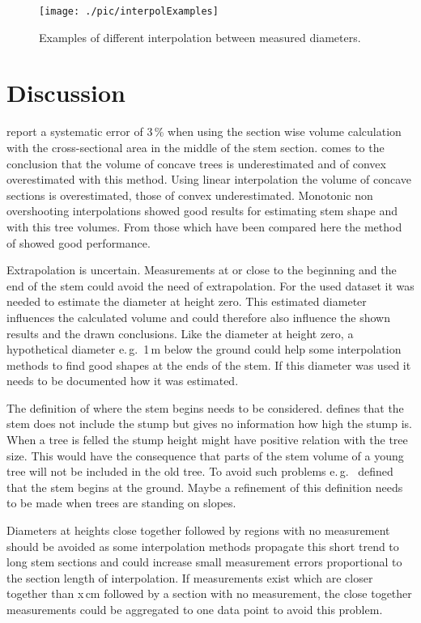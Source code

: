\documentclass[twocolumn]{scrartcl}
\begin{document}
\begin{figure}[htbp]
  \centering
  \texttt{[image: ./pic/interpolExamples]}
  \caption{Examples of different interpolation between measured diameters.}
  \label{fig:interpolExamples}
\end{figure}


\section{Discussion}

\cite{mueller1902holzmesskunde,müller1923holzmesskunde} report a systematic
error of 3\,\% when using the section wise volume calculation with the
cross-sectional area in the middle of the stem section.
\cite{prodan1965holzmesslehre} comes to the conclusion that the volume of
concave trees is underestimated and of convex overestimated with this method.
Using linear interpolation the volume of concave sections is overestimated,
those of convex underestimated. Monotonic non overshooting interpolations showed
good results for estimating stem shape and with this tree volumes. From those
which have been compared here the method of \cite{steffen1990interpolation}
showed good performance.

Extrapolation is uncertain. Measurements at or close to the beginning and the
end of the stem could avoid the need of extrapolation. For the used dataset it
was needed to estimate the diameter at height zero. This estimated diameter
influences the calculated volume and could therefore also influence the shown
results and the drawn conclusions. Like the diameter at height zero, a
hypothetical diameter e.\,g.\ 1\,m below the ground could help some
interpolation methods to find good shapes at the ends of the stem. If this
diameter was used it needs to be documented how it was estimated.

The definition of where the stem begins needs to be considered.
\cite{prodan1965holzmesslehre} defines that the stem does not include the stump
but gives no information how high the stump is. When a tree is felled the stump
height might have positive relation with the tree size. This would have the
consequence that parts of the stem volume of a young tree will not be included
in the old tree. To avoid such problems e.\,g.\
\cite{assmann1961waldertragskunde} defined that the stem begins at the ground.
Maybe a refinement of this definition needs to be made when trees are standing
on slopes.

Diameters at heights close together followed by regions with no measurement
should be avoided as some interpolation methods propagate this short trend to
long stem sections and could increase small measurement errors proportional to
the section length of interpolation. If measurements exist which are closer
together than x\,cm followed by a section with no measurement, the close
together measurements could be aggregated to one data point to avoid this
problem.
\end{document}
